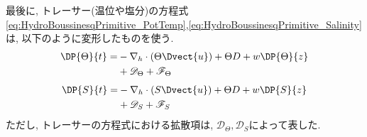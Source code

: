 最後に, トレーサー(温位や塩分)の方程式\eqref{eq:HydroBoussinesqPrimitive_PotTemp},\eqref{eq:HydroBoussinesqPrimitive_Salinity}は, 以下のように変形したものを使う.
\begin{align}
 \DP{\Theta}{t}
 = &- \nabla_h \cdot (\Theta \Dvect{u}) + \Theta D + w\DP{\Theta}{z} \nonumber \\
   &+ \mathscr{D}_{\Theta}
    + \mathscr{F}_{\Theta}  
\label{eq:HydroBoussinesqPrimitive_PotTemp_2}
\end{align}
\begin{align}
 \DP{S}{t}
 = &- \nabla_h \cdot (S \Dvect{u}) + \Theta D + w\DP{S}{z} \nonumber \\
   &+ \mathscr{D}_{S}
    + \mathscr{F}_{S}  
\label{eq:HydroBoussinesqPrimitive_Salt_2}
\end{align}
ただし, トレーサーの方程式における拡散項は, $\mathscr{D}_\Theta, \mathscr{D}_S$によって表した. 
